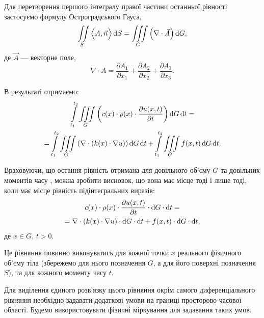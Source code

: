 Для перетворення першого інтегралу правої частини останньої рівності застосуємо формулу Остроградського Гауса,  
\begin{equation}
	\displaystyle\iint\limits_S \Big\langle A, \vec n \Big\rangle \mathop{}\!\mathrm{d} S = \displaystyle\iiint\limits_G \Big(\nabla \cdot \vec A\Big) \mathop{}\!\mathrm{d} G,
\end{equation}
де $\vec A$ --- векторне поле,
\begin{equation}
	\nabla \cdot A = \frac{\partial A_1}{\partial x_1} + \frac{\partial A_2}{\partial x_2} + \frac{\partial A_3}{\partial x_3}.
\end{equation}

В результаті отримаємо:
\begin{multline}
	\displaystyle\int\limits_{t_1}^{t_2} \displaystyle\iiint\limits_G \left( c(x) \cdot \rho(x) \cdot \frac{\partial u(x, t)}{\partial t} \right) \mathop{}\!\mathrm{d} G \mathop{}\!\mathrm{d} t = \\
	= \displaystyle\int\limits_{t_1}^{t_2} \displaystyle\iiint\limits_G \left( \nabla \cdot (k(x) \cdot \nabla u) \right) \mathop{}\!\mathrm{d} G \mathop{}\!\mathrm{d} t + \displaystyle\int\limits_{t_1}^{t_2} \displaystyle\iiint\limits_G f(x, t) \mathop{}\!\mathrm{d} G \mathop{}\!\mathrm{d} t.
\end{multline}

Враховуючи, що остання рівність отримана для довільного об'єму $G$ та довільних моментів часу  , можна зробити висновок, що вона має місце тоді і лише тоді, коли має місце рівність підінтегральних виразів:
\begin{multline}
	c(x) \cdot \rho(x) \cdot \frac{\partial u(x, t)}{\partial t} \cdot \mathop{}\!\mathrm{d} G \cdot \mathop{}\!\mathrm{d} t = \\
	= \nabla \cdot (k(x) \cdot \nabla u) \cdot \mathop{}\!\mathrm{d} G \cdot \mathop{}\!\mathrm{d} t + f(x, t) \cdot \mathop{}\!\mathrm{d} G \cdot \mathop{}\!\mathrm{d} t,
\end{multline}
де $x \in G$, $t > 0$. \medskip

Це рівняння повинно виконуватись для кожної точки $x$ реального фізичного об'єму тіла (збережемо для нього позначення $G$, а для його поверхні позначення $S$), та для кожного моменту часу $t$. \medskip

Для виділення єдиного розв'язку цього рівняння окрім самого диференціального рівняння необхідно задавати додаткові умови на границі просторово-часової області. Будемо використовувати фізичні міркування для задавання таких умов.

